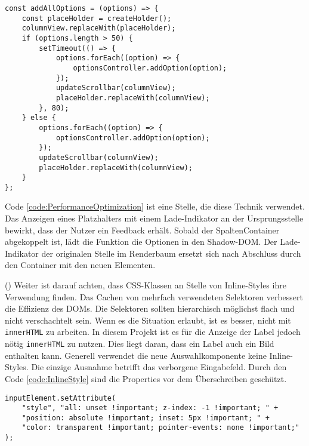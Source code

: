 \begin{lstlisting}[style = htmlcssjs, caption = Performance Optimierung (aus \texttt{columnOptionsComponent.js}), label = code:PerformanceOptimization]
const addAllOptions = (options) => {
    const placeHolder = createHolder();
    columnView.replaceWith(placeHolder);
    if (options.length > 50) {
        setTimeout(() => {
            options.forEach((option) => {
                optionsController.addOption(option);
            });
            updateScrollbar(columnView);
            placeHolder.replaceWith(columnView);
        }, 80);
    } else {
        options.forEach((option) => {
            optionsController.addOption(option);
        });
        updateScrollbar(columnView);
        placeHolder.replaceWith(columnView);
    }
};
\end{lstlisting}

Code \ref{code:PerformanceOptimization} ist eine Stelle, die diese Technik verwendet.
Das Anzeigen eines Platzhalters mit einem Lade-Indikator an der Ursprungsstelle bewirkt, dass der Nutzer ein Feedback erhält.
Sobald der SpaltenContainer abgekoppelt ist, lädt die Funktion die Optionen in den Shadow-DOM.
Der Lade-Indikator der originalen Stelle im Renderbaum ersetzt sich nach Abschluss durch den Container mit den neuen Elementen. 

(\cite{efficientDomManipulation}) Weiter ist darauf achten, dass CSS-Klassen an Stelle von Inline-Styles ihre Verwendung finden.
Das Cachen von mehrfach verwendeten Selektoren verbessert die Effizienz des DOMs.
Die Selektoren sollten hierarchisch möglichst flach und nicht verschachtelt sein.
Wenn es die Situation erlaubt, ist es besser, nicht mit \texttt{innerHTML} zu arbeiten.
In diesem Projekt ist es für die Anzeige der Label jedoch nötig \texttt{innerHTML} zu nutzen.
Dies liegt daran, dass ein Label auch ein Bild enthalten kann.
Generell verwendet die neue Auswahlkomponente keine Inline-Styles.
Die einzige Ausnahme betrifft das verborgene Eingabefeld. 
Durch den Code \ref{code:InlineStyle} sind die Properties vor dem Überschreiben geschützt.

\begin{lstlisting}[style = htmlcssjs, caption = Inline-Style für Input-Feld, label = code:InlineStyle]
inputElement.setAttribute(
    "style", "all: unset !important; z-index: -1 !important; " +
    "position: absolute !important; inset: 5px !important; " +
    "color: transparent !important; pointer-events: none !important;"
);
\end{lstlisting}

